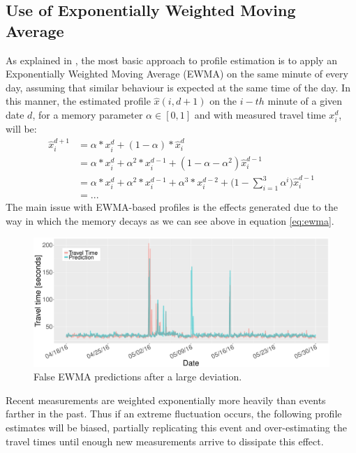 \documentclass[letterpaper, 10 pt, conference]{ieeeconf}  %
\begin{document}
\subsection{Use of Exponentially Weighted Moving Average} \label{ewma}
As explained in \cite{ttprofiles}, the most basic approach to profile estimation is to apply an Exponentially Weighted Moving Average (EWMA) on the same minute of every day, assuming that similar behaviour is expected at the same time of the day. 
In this manner, the estimated profile $\hat{x}(i,d+1)$ on the $i-th$ minute of a given date $d$, for a memory parameter $\alpha \in [0,1]$ and with measured travel time $x_i^d$, will be:
\begin{equation}
\begin{aligned}
\hat{x}^{d+1}_i &= \alpha * x^{d}_{i} + (1-\alpha)*\hat{x}^{d}_{i} \\ 
&= \alpha * x^{d}_{i} + \alpha^2 * x^{d-1}_{i} + (1-\alpha - \alpha^2) \hat{x}^{d-1}_{i}\\ 
&= \alpha * x^{d}_{i} + \alpha^2 * x^{d-1}_{i} + \alpha^3 * x^{d-2}_{i} + \bigg( 1-\sum_{i=1}^{3} \alpha^i \bigg) \hat{x}^{d-1}_{i}\\
&= ...
\end{aligned}
\label{eq:ewma}
\end{equation}
The main issue with EWMA-based profiles is the effects generated due to the way in which the memory decays as we can see above in equation \ref{eq:ewma}.
\begin{figure}[htbp]
	\centerline{\includegraphics[width=\linewidth]{./images/EWMA.pdf}}
	\caption{False EWMA predictions after a large deviation.}
	\label{fig:EWMA}
\end{figure}
Recent measurements are weighted exponentially more heavily than events farther in the past. 
Thus if an extreme fluctuation occurs, the following profile estimates will be biased, partially replicating this event and over-estimating the travel times until enough new measurements arrive to dissipate this effect.
\end{document}
